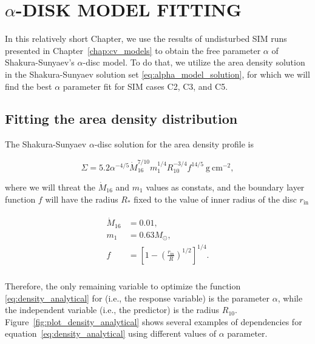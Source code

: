\chapter{$\alpha$-DISK MODEL FITTING}
\label{chap:alpha_model_fitting}
\thispagestyle{empty}

In this relatively short Chapter, we use the results of undisturbed SIM runs presented in Chapter~\ref{chap:cv_models} to obtain the free parameter $\alpha$ of Shakura-Sunyaev's $\alpha$-disc model. To do that, we utilize the area density solution in the Shakura-Sunyaev solution set \eqref{eq:alpha_model_solution}, for which we will find the best $\alpha$ parameter fit for SIM cases C2, C3, and C5.

\section{Fitting the area density distribution}
    The Shakura-Sunyaev $\alpha$-disc solution for the area density profile is

    \begin{equation}
        \Sigma = 5.2 \alpha^{-4/5} \dot{M}^{7/10}_{16} m^{1/4}_1 R^{-3/4}_{10} f^{14/5}\ \si{\gram\ \cm^{-2}},
        \label{eq:density_analytical}
    \end{equation}

    where we will threat the $\dot{M}_{16}$ and $m_1$ values as constats, and the boundary layer function $f$ will have the radius $R_*$ fixed to the value of inner radius of the disc $r_{\mathrm{in}}$

    \begin{align}
        \begin{split}
            \dot{M}_{16} &= 0.01, \\
            m_1 &= 0.63 M_{\odot}, \\
            f &= \left[ 1 - \left( \frac{r_{\mathrm{in}}}{R} \right)^{1/2} \right]^{1/4}. \\
        \end{split}
    \end{align}

    Therefore, the only remaining variable to optimize the function \eqref{eq:density_analytical} for (i.e., the response variable) is the parameter $\alpha$, while the independent variable (i.e., the predictor) is the radius $R_{10}$. Figure~\ref{fig:plot_density_analytical} shows several examples of dependencies for equation~\eqref{eq:density_analytical} using different values of $\alpha$ parameter.  
    
